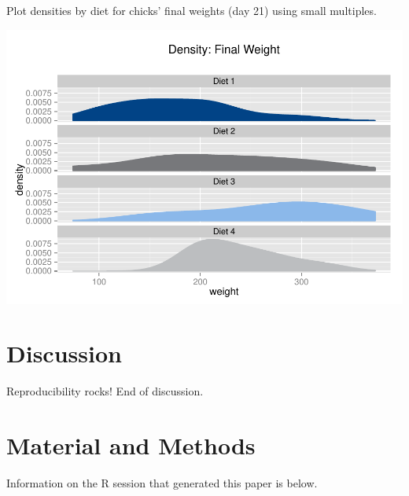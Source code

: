 \documentclass[10pt]{article}
\newenvironment{CodeChunk}{}{}
\begin{document}
Plot densities by diet for chicks' final weights (day 21) using small
multiples.

\begin{CodeChunk}

\includegraphics{Reproducible_Research_Demo_for_PLoS_files/figure-latex/unnamed-chunk-11-1} \end{CodeChunk}

\section*{Discussion}\label{discussion}

Reproducibility rocks! End of discussion.

\section*{Material and Methods}\label{material-and-methods}

Information on the R session that generated this paper is below.
\end{document}
